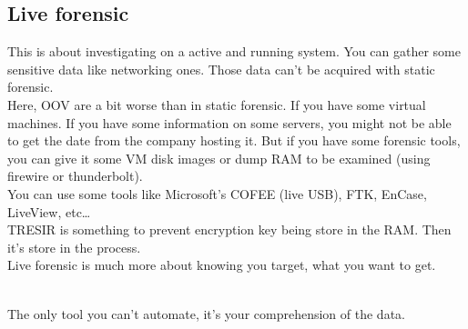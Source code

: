 \subsection{Live forensic}
This is about investigating on a active and running system. You can gather some sensitive data like networking ones. Those data can't be acquired with static forensic.\\
Here, OOV are a bit worse than in static forensic. If you have some virtual machines. If you have some information on some servers, you might not be able to get the date from the company hosting it. But if you have some forensic tools, you can give it some VM disk images or dump RAM to be examined (using firewire or thunderbolt).\\
You can use some tools like Microsoft's COFEE (live USB), FTK, EnCase, LiveView, etc\ldots\\
TRESIR is something to prevent encryption key being store in the RAM. Then it's store in the process.\\
Live forensic is much more about knowing you target, what you want to get.\\~\\\par
The only tool you can't automate, it's your comprehension of the data.